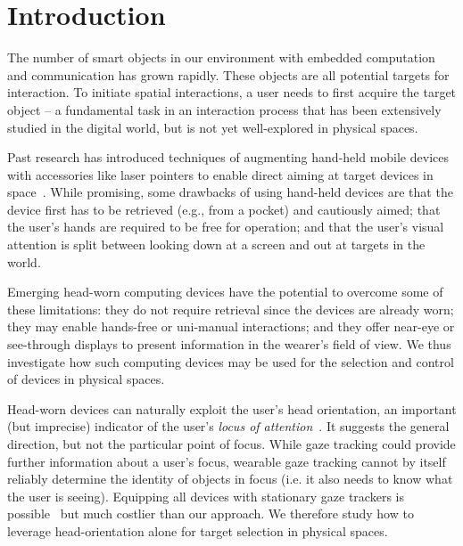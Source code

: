 \section{Introduction}

The number of smart objects in our environment with embedded computation and communication has grown rapidly. These objects are all potential targets for interaction. To initiate spatial interactions, a user needs to first acquire the target object -- a fundamental task in an interaction process that has been extensively studied in the digital world, but is not yet well-explored in physical spaces.


Past research has introduced techniques of augmenting hand-held mobile devices with accessories like laser pointers to enable direct aiming at target devices in space~\cite{beigl_point_1999,patel_2-way_2003}. While promising, some drawbacks of using hand-held devices are that the device first has to be retrieved (e.g., from a pocket) and cautiously aimed; that the user's hands are required to be free for operation; and that the user's visual attention is split between looking down at a screen and out at targets in the world. 

Emerging head-worn computing devices have the potential to overcome some of these limitations: they do not require retrieval since the devices are already worn; they may enable hands-free or uni-manual interactions; and they offer near-eye or see-through displays to present information in the wearer's field of view. We thus investigate how such computing devices may be used for the selection and control of devices in physical spaces.

Head-worn devices can naturally exploit the user's head orientation, an important (but imprecise) indicator of the user's {\em locus of attention}~\cite{raskin}. It suggests the general direction, but not the particular point of focus. While gaze tracking could provide further information about a user's focus, wearable gaze tracking cannot by itself reliably determine the identity of objects in focus (i.e. it also needs to know what the user is seeing). Equipping all devices with stationary gaze trackers is possible~\cite{vertegaal2005media} but much costlier than our approach. We therefore study how to leverage head-orientation alone for target selection in physical spaces. 

